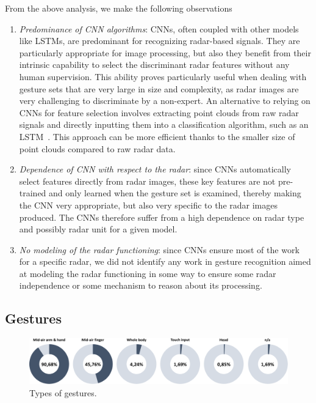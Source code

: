 From the above analysis, we make the following observations
\begin{enumerate}
    \item \textit{Predominance of CNN algorithms}: CNNs, often coupled with other models like LSTMs, are predominant for recognizing radar-based signals. They are particularly appropriate for image processing, but also they benefit from their intrinsic capability to select the discriminant radar features without any human supervision. This ability proves particularly useful when dealing with gesture sets that are very large in size and complexity, as radar images are very challenging to discriminate by a non-expert.
    An alternative to relying on CNNs for feature selection involves extracting point clouds from raw radar signals and directly inputting them into a classification algorithm, such as an LSTM~\cite{Palipana:2021}. This approach can be more efficient thanks to the smaller size of point clouds compared to raw radar data.
    \item \textit{Dependence of CNN with respect to the radar}: since CNNs automatically select features directly from radar images, these key features are not pre-trained and only learned when the gesture set is examined, thereby making the CNN very appropriate, but also very specific to the radar images produced. The CNNs therefore suffer from a high dependence on radar type and possibly radar unit for a given model. 
    \item \textit{No modeling of the radar functioning}: since CNNs ensure most of the work for a specific radar, we did not identify any work in gesture recognition aimed at modeling the radar functioning in some way to ensure some radar independence or some mechanism to reason about its processing. 
\end{enumerate}



\subsection{Gestures} \label{sec:state_of_the_art:radar:gestures}

\begin{figure}[!b]
    \centering
    \includegraphics[width=\linewidth]{Figures/StateOfTheArt/Radar/gestures-type.pdf}
    \caption{Types of gestures.}
    \label{fig:state_of_the_art:radar:gestures-type}
\end{figure}


